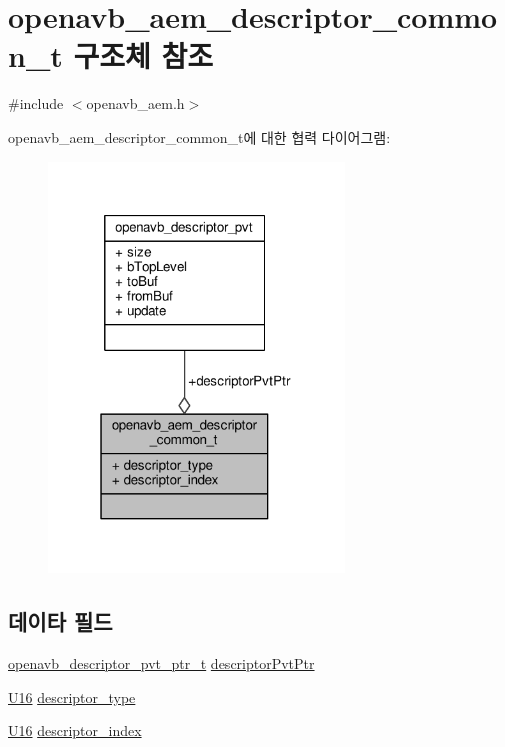 \hypertarget{structopenavb__aem__descriptor__common__t}{}\section{openavb\+\_\+aem\+\_\+descriptor\+\_\+common\+\_\+t 구조체 참조}
\label{structopenavb__aem__descriptor__common__t}


{\ttfamily \#include $<$openavb\+\_\+aem.\+h$>$}



openavb\+\_\+aem\+\_\+descriptor\+\_\+common\+\_\+t에 대한 협력 다이어그램\+:
\nopagebreak
\begin{figure}[H]
\begin{center}
\leavevmode
\includegraphics[width=223pt]{structopenavb__aem__descriptor__common__t__coll__graph}
\end{center}
\end{figure}
\subsection*{데이타 필드}
\begin{DoxyCompactItemize}
\item 
\hyperlink{openavb__aem__pub_8h_a85eabab4b7d2466e94c1c3b43b11371d}{openavb\+\_\+descriptor\+\_\+pvt\+\_\+ptr\+\_\+t} \hyperlink{structopenavb__aem__descriptor__common__t_a302e92fd6cf4d398d5305395359fb157}{descriptor\+Pvt\+Ptr}
\item 
\hyperlink{openavb__types__base__pub_8h_a0a0a322d5fa4a546d293a77ba8b4a71f}{U16} \hyperlink{structopenavb__aem__descriptor__common__t_a1e231d7874aada5925b29affc76782cc}{descriptor\+\_\+type}
\item 
\hyperlink{openavb__types__base__pub_8h_a0a0a322d5fa4a546d293a77ba8b4a71f}{U16} \hyperlink{structopenavb__aem__descriptor__common__t_ab26fb363c24b9a2a4391f9171c981b08}{descriptor\+\_\+index}
\end{DoxyCompactItemize}


